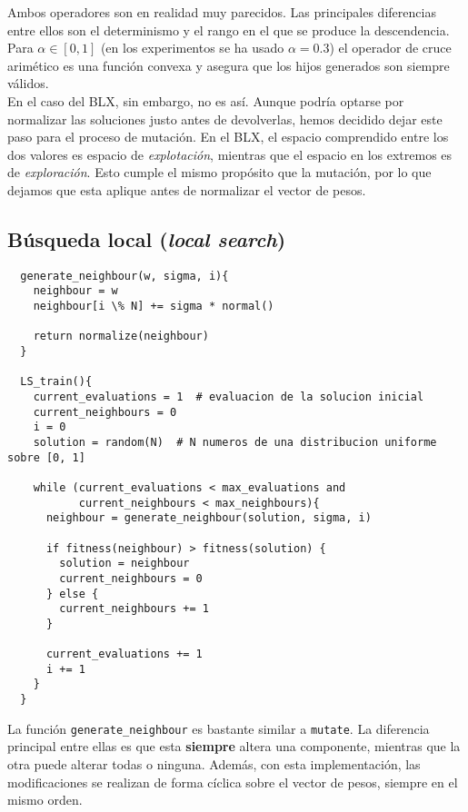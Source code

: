 \documentclass[11pt]{article}
\theoremstyle{plain}
\theoremstyle{definition}
\begin{document}
Ambos operadores son en
realidad muy parecidos. Las principales diferencias entre ellos son el
determinismo y el rango en el que se produce la descendencia. Para
$\alpha \in [0, 1]$ (en los experimentos se ha usado $\alpha = 0.3$)
el operador de cruce arimético es una función convexa y asegura que
los hijos generados son siempre válidos. \\

En el caso del BLX, sin
embargo, no es así. Aunque podría optarse por normalizar las
soluciones justo antes de devolverlas, hemos decidido dejar este paso
para el proceso de mutación. En el BLX, el espacio comprendido entre
los dos valores es espacio de \textit{explotación}, mientras que el
espacio en los extremos es de \textit{exploración}. Esto
cumple el mismo propósito que la mutación, por lo que dejamos que esta
aplique antes de normalizar el vector de pesos.

\subsection{Búsqueda local (\textit{local search})}

\begin{lstlisting}
  generate_neighbour(w, sigma, i){
    neighbour = w
    neighbour[i \% N] += sigma * normal()

    return normalize(neighbour)
  }

  LS_train(){
    current_evaluations = 1  # evaluacion de la solucion inicial
    current_neighbours = 0
    i = 0
    solution = random(N)  # N numeros de una distribucion uniforme sobre [0, 1]

    while (current_evaluations < max_evaluations and
           current_neighbours < max_neighbours){
      neighbour = generate_neighbour(solution, sigma, i)

      if fitness(neighbour) > fitness(solution) {
        solution = neighbour
        current_neighbours = 0
      } else {
        current_neighbours += 1
      }

      current_evaluations += 1
      i += 1
    }
  }
\end{lstlisting}

La función \texttt{generate\_neighbour} es bastante similar a \texttt{mutate}. La diferencia principal entre ellas es que esta \textbf{siempre} altera una componente, mientras que la otra puede alterar todas o ninguna. Además, con esta implementación, las modificaciones se realizan de forma cíclica sobre el vector de pesos, siempre en el mismo orden. \\
\end{document}
